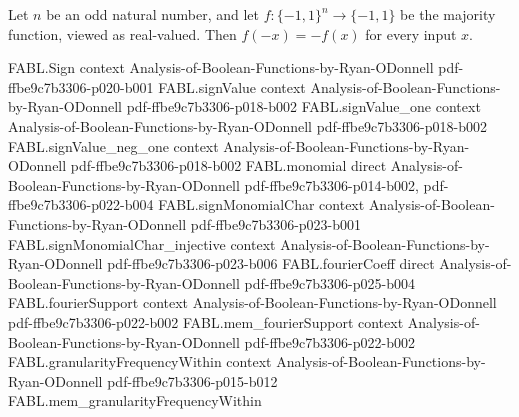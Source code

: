 \begin{theorem}
\label{FABL.majority_toReal_odd}
\leanok
{}
Let $n$ be an odd natural number, and let $f:\{-1,1\}^n\to\{-1,1\}$ be the majority
function, viewed as real-valued. Then $f(-x)=-f(x)$ for every input $x$.
\end{theorem}

\begin{theorem}
\label{FABL.fourierCoeff_majority_eq_zero_of_odd_arity_of_even_card}
\leanok
{}
\proofstep
  {FABL.Sign}
  {context}
  {Analysis-of-Boolean-Functions-by-Ryan-ODonnell}
  {pdf-ffbe9c7b3306-p020-b001}
\proofstep
  {FABL.signValue}
  {context}
  {Analysis-of-Boolean-Functions-by-Ryan-ODonnell}
  {pdf-ffbe9c7b3306-p018-b002}
\proofstep
  {FABL.signValue_one}
  {context}
  {Analysis-of-Boolean-Functions-by-Ryan-ODonnell}
  {pdf-ffbe9c7b3306-p018-b002}
\proofstep
  {FABL.signValue_neg_one}
  {context}
  {Analysis-of-Boolean-Functions-by-Ryan-ODonnell}
  {pdf-ffbe9c7b3306-p018-b002}
\proofstep
  {FABL.monomial}
  {direct}
  {Analysis-of-Boolean-Functions-by-Ryan-ODonnell}
  {pdf-ffbe9c7b3306-p014-b002,
    pdf-ffbe9c7b3306-p022-b004}
\proofstep
  {FABL.signMonomialChar}
  {context}
  {Analysis-of-Boolean-Functions-by-Ryan-ODonnell}
  {pdf-ffbe9c7b3306-p023-b001}
\proofstep
  {FABL.signMonomialChar_injective}
  {context}
  {Analysis-of-Boolean-Functions-by-Ryan-ODonnell}
  {pdf-ffbe9c7b3306-p023-b006}
\proofstep
  {FABL.fourierCoeff}
  {direct}
  {Analysis-of-Boolean-Functions-by-Ryan-ODonnell}
  {pdf-ffbe9c7b3306-p025-b004}
\proofstep
  {FABL.fourierSupport}
  {context}
  {Analysis-of-Boolean-Functions-by-Ryan-ODonnell}
  {pdf-ffbe9c7b3306-p022-b002}
\proofstep
  {FABL.mem_fourierSupport}
  {context}
  {Analysis-of-Boolean-Functions-by-Ryan-ODonnell}
  {pdf-ffbe9c7b3306-p022-b002}
\proofstep
  {FABL.granularityFrequencyWithin}
  {context}
  {Analysis-of-Boolean-Functions-by-Ryan-ODonnell}
  {pdf-ffbe9c7b3306-p015-b012}
\proofstep
  {FABL.mem_granularityFrequencyWithin}

\end{theorem}
